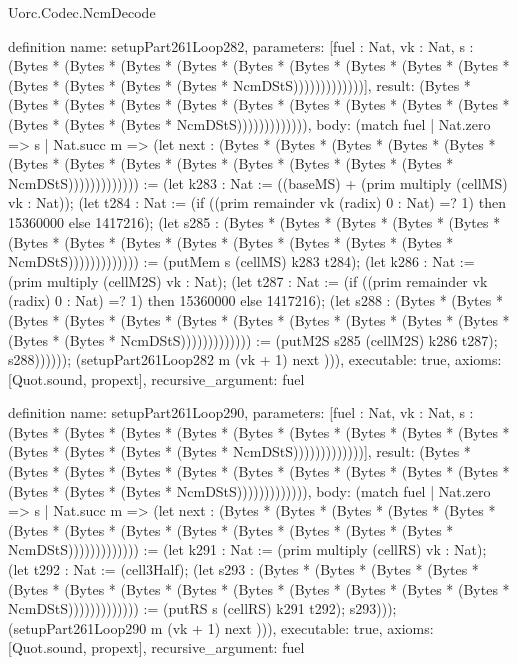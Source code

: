 \begin{lexlean}{Uorc.Codec.NcmDecode}
\begin{semanticmodule}
definition{
  name: setupPart261Loop282,
  parameters: [fuel : Nat, vk : Nat, s : (Bytes * (Bytes * (Bytes * (Bytes * (Bytes * (Bytes * (Bytes * (Bytes * (Bytes * (Bytes * (Bytes * (Bytes * (Bytes * NcmDStS)))))))))))))],
  result: (Bytes * (Bytes * (Bytes * (Bytes * (Bytes * (Bytes * (Bytes * (Bytes * (Bytes * (Bytes * (Bytes * (Bytes * (Bytes * NcmDStS))))))))))))),
  body: (match fuel
    | Nat.zero => s
    | Nat.succ m => (let next : (Bytes * (Bytes * (Bytes * (Bytes * (Bytes * (Bytes * (Bytes * (Bytes * (Bytes * (Bytes * (Bytes * (Bytes * (Bytes * NcmDStS))))))))))))) := (let k283 : Nat := ((baseMS) + (prim multiply (cellMS) vk : Nat)); (let t284 : Nat := (if ((prim remainder vk (radix) 0 : Nat) =? 1) then 15360000 else 1417216); (let s285 : (Bytes * (Bytes * (Bytes * (Bytes * (Bytes * (Bytes * (Bytes * (Bytes * (Bytes * (Bytes * (Bytes * (Bytes * (Bytes * NcmDStS))))))))))))) := (putMem s (cellMS) k283 t284); (let k286 : Nat := (prim multiply (cellM2S) vk : Nat); (let t287 : Nat := (if ((prim remainder vk (radix) 0 : Nat) =? 1) then 15360000 else 1417216); (let s288 : (Bytes * (Bytes * (Bytes * (Bytes * (Bytes * (Bytes * (Bytes * (Bytes * (Bytes * (Bytes * (Bytes * (Bytes * (Bytes * NcmDStS))))))))))))) := (putM2S s285 (cellM2S) k286 t287); s288)))))); (setupPart261Loop282 m (vk + 1) next ))),
  executable: true,
  axioms: [Quot.sound, propext],
  recursive_argument: fuel
}

definition{
  name: setupPart261Loop290,
  parameters: [fuel : Nat, vk : Nat, s : (Bytes * (Bytes * (Bytes * (Bytes * (Bytes * (Bytes * (Bytes * (Bytes * (Bytes * (Bytes * (Bytes * (Bytes * (Bytes * NcmDStS)))))))))))))],
  result: (Bytes * (Bytes * (Bytes * (Bytes * (Bytes * (Bytes * (Bytes * (Bytes * (Bytes * (Bytes * (Bytes * (Bytes * (Bytes * NcmDStS))))))))))))),
  body: (match fuel
    | Nat.zero => s
    | Nat.succ m => (let next : (Bytes * (Bytes * (Bytes * (Bytes * (Bytes * (Bytes * (Bytes * (Bytes * (Bytes * (Bytes * (Bytes * (Bytes * (Bytes * NcmDStS))))))))))))) := (let k291 : Nat := (prim multiply (cellRS) vk : Nat); (let t292 : Nat := (cell3Half); (let s293 : (Bytes * (Bytes * (Bytes * (Bytes * (Bytes * (Bytes * (Bytes * (Bytes * (Bytes * (Bytes * (Bytes * (Bytes * (Bytes * NcmDStS))))))))))))) := (putRS s (cellRS) k291 t292); s293))); (setupPart261Loop290 m (vk + 1) next ))),
  executable: true,
  axioms: [Quot.sound, propext],
  recursive_argument: fuel
}


\end{semanticmodule}
\end{lexlean}
